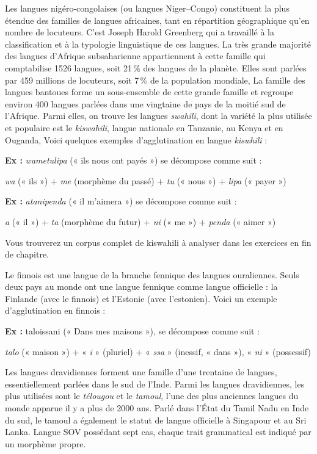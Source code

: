 Les langues nigéro-congolaises (ou langues Niger–Congo) constituent la plus étendue des familles de langues africaines, tant en répartition géographique qu’en nombre de locuteurs. C’est Joseph Harold Greenberg qui a travaillé à la classification et à la typologie linguistique de ces langues. La très grande majorité des langues d’Afrique subsaharienne appartiennent à cette famille qui comptabilise 1526 langues, soit 21\,\% des langues de la planète. Elles sont parlées par 459 millions de locuteurs, soit 7\,\% de la population mondiale, La famille des langues bantoues forme un sous-ensemble de cette grande famille et regroupe environ 400 langues parlées dans une vingtaine de pays de la moitié sud de l’Afrique. Parmi elles, on trouve les langues \textit{swahili}, dont la variété la plus utilisée et populaire est le \textit{kiswahili}, langue nationale en Tanzanie, au Kenya et en Ouganda, Voici quelques exemples d’agglutination en langue \textit{kiswhili} :

\noindent\textbf{Ex :} \textit{wametulipa} (« ils nous ont payés ») se décompose comme suit :

\noindent\textit{wa} (« ils ») + \textit{me} (morphème du passé) + \textit{tu} (« nous ») + \textit{lipa} (« payer »)

\noindent\textbf{Ex :} \textit{atanipenda} (« il m’aimera ») se décompose comme suit :

\noindent\textit{a} (« il ») + \textit{ta} (morphème du futur) + \textit{ni} (« me ») + \textit{penda} (« aimer »)

Vous trouverez un corpus complet de kiswahili à analyser dans les exercices en fin de chapitre.

Le finnois est une langue de la branche fennique des langues ouraliennes. Seuls deux pays au monde ont une langue fennique comme langue officielle : la Finlande (avec le finnois) et l’Estonie (avec l’estonien). Voici un exemple d’agglutination en finnois :

\noindent\textbf{Ex :} taloissani (« Dans mes maisons »), se décompose comme suit :

\noindent\textit{talo} (« maison ») + « \textit{i} » (pluriel) + « \textit{ssa} » (inessif, « dans »), « \textit{ni} » (possessif)

Les langues dravidiennes forment une famille d’une trentaine de langues, essentiellement parlées dans le sud de l’Inde. Parmi les langues dravidiennes, les plus utilisées sont le \textit{télougou} et le \textit{tamoul}, l’une des plus anciennes langues du monde apparue il y a plus de 2000 ans. Parlé dans l’État du Tamil Nadu en Inde du sud, le tamoul a également le statut de langue officielle à Singapour et au Sri Lanka. Langue SOV possédant sept cas, chaque trait grammatical est indiqué par un morphème propre.

